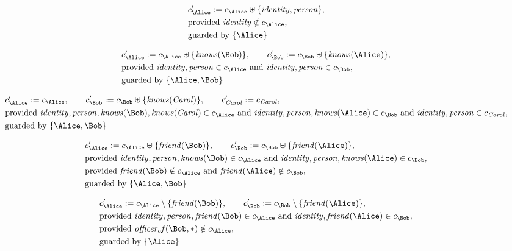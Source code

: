 \begin{align*}
&
c'_
{
\Alice
}
 := 
c_
{
\Alice
}
 \uplus 
\{
\mathit{
identity
}
,
\mathit{
person
}
\}
,\\
&
\text{provided } 
\mathit{
identity
}
 \notin c_
{
\Alice
}
,\\
&
\text{guarded by } \{
\Alice
\}
\end{align*}

\begin{align*}
&
c'_
{
\Alice
}
 := 
c_
{
\Alice
}
 \uplus 
\{
\mathit{
knows
}
(
\Bob
)
\}
, \qquad 
c'_
{
\Bob
}
 := 
c_
{
\Bob
}
 \uplus 
\{
\mathit{
knows
}
(
\Alice
)
\}
,\\
&
\text{provided } 
\mathit{
identity
}
,
\mathit{
person
}
 \in c_
{
\Alice
}
 \text{ and } 
\mathit{
identity
}
,
\mathit{
person
}
 \in c_
{
\Bob
}
,\\
&
\text{guarded by } \{
\Alice
,
\Bob
\}
\end{align*}

\begin{align*}
&
c'_
{
\Alice
}
 := 
c_
{
\Alice
}
, \qquad 
c'_
{
\Bob
}
 := 
c_
{
\Bob
}
 \uplus 
\{
\mathit{
knows
}
(
\mathit{Carol}
)
\}
, \qquad 
c'_
{
\mathit{Carol}
}
 := 
c_
{
\mathit{Carol}
}
,\\
&
\text{provided } 
\mathit{
identity
}
,
\mathit{
person
}
,
\mathit{
knows
}
(
\Bob
)
,
\mathit{
knows
}
(
\mathit{Carol}
)
 \in c_
{
\Alice
}
 \text{ and } 
\mathit{
identity
}
,
\mathit{
person
}
,
\mathit{
knows
}
(
\Alice
)
 \in c_
{
\Bob
}
 \text{ and } 
\mathit{
identity
}
,
\mathit{
person
}
 \in c_
{
\mathit{Carol}
}
,\\
&
\text{guarded by } \{
\Alice
,
\Bob
\}
\end{align*}

\begin{align*}
&
c'_
{
\Alice
}
 := 
c_
{
\Alice
}
 \uplus 
\{
\mathit{
friend
}
(
\Bob
)
\}
, \qquad 
c'_
{
\Bob
}
 := 
c_
{
\Bob
}
 \uplus 
\{
\mathit{
friend
}
(
\Alice
)
\}
,\\
&
\text{provided } 
\mathit{
identity
}
,
\mathit{
person
}
,
\mathit{
knows
}
(
\Bob
)
 \in c_
{
\Alice
}
 \text{ and } 
\mathit{
identity
}
,
\mathit{
person
}
,
\mathit{
knows
}
(
\Alice
)
 \in c_
{
\Bob
}
,\\
&
\text{provided } 
\mathit{
friend
}
(
\Bob
)
 \notin c_
{
\Alice
}
 \text{ and } 
\mathit{
friend
}
(
\Alice
)
 \notin c_
{
\Bob
}
,\\
&
\text{guarded by } \{
\Alice
,
\Bob
\}
\end{align*}

\begin{align*}
&
c'_
{
\Alice
}
 := 
c_
{
\Alice
}
 \setminus 
\{
\mathit{
friend
}
(
\Bob
)
\}
, \qquad 
c'_
{
\Bob
}
 := 
c_
{
\Bob
}
 \setminus 
\{
\mathit{
friend
}
(
\Alice
)
\}
,\\
&
\text{provided } 
\mathit{
identity
}
,
\mathit{
person
}
,
\mathit{
friend
}
(
\Bob
)
 \in c_
{
\Alice
}
 \text{ and } 
\mathit{
identity
}
,
\mathit{
friend
}
(
\Alice
)
 \in c_
{
\Bob
}
,\\
&
\text{provided } 
\mathit{
officer_of
}
(
\Bob
,
\ast
)
 \notin c_
{
\Alice
}
,\\
&
\text{guarded by } \{
\Alice
\}
\end{align*}
